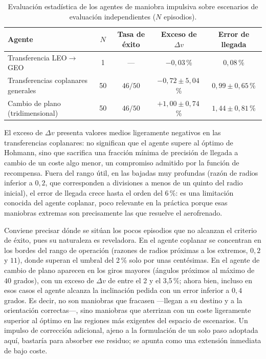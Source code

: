\begin{table}[htbp]
  \centering
  \caption{Evaluación estadística de los agentes de maniobra impulsiva sobre escenarios de evaluación independientes ($N$ episodios).}
  \label{tab:res-ia-estadistica}
  \begin{tabularx}{\textwidth}{X c c c c}
    \hline
    \textbf{Agente} & \textbf{$N$} & \textbf{Tasa de éxito} & \textbf{Exceso de $\Delta v$} & \textbf{Error de llegada} \\
    \hline
    Transferencia LEO$\rightarrow$GEO      & 1  & ---     & $-0{,}03$\,\%              & $0{,}08$\,\%              \\
    Transferencias coplanares generales    & 50 & $46/50$ & $-0{,}72 \pm 5{,}04$\,\%   & $0{,}99 \pm 0{,}65$\,\%   \\
    Cambio de plano (tridimensional)       & 50 & $46/50$ & $+1{,}00 \pm 0{,}74$\,\%   & $1{,}44 \pm 0{,}81$\,\%   \\
    \hline
  \end{tabularx}
\end{table}

El exceso de $\Delta v$ presenta valores medios ligeramente negativos en las transferencias coplanares: no significan que el agente supere al óptimo de Hohmann, sino que sacrifica una fracción mínima de precisión de llegada a cambio de un coste algo menor, un compromiso admitido por la función de recompensa. Fuera del rango útil, en las bajadas muy profundas (razón de radios inferior a $0{,}2$, que corresponden a divisiones a menos de un quinto del radio inicial), el error de llegada crece hasta el orden del 6\,\%: es una limitación conocida del agente coplanar, poco relevante en la práctica porque esas maniobras extremas son precisamente las que resuelve el aerofrenado.

Conviene precisar dónde se sitúan los pocos episodios que no alcanzan el criterio de éxito, pues su naturaleza es reveladora. En el agente coplanar se concentran en los bordes del rango de operación (razones de radios próximas a los extremos, $0{,}2$ y $11$), donde superan el umbral del 2\,\% solo por unas centésimas. En el agente de cambio de plano aparecen en los giros mayores (ángulos próximos al máximo de $40$ grados), con un exceso de $\Delta v$ de entre el 2 y el 3,5\,\%; ahora bien, incluso en esos casos el agente alcanza la inclinación pedida con un error inferior a $0{,}4$ grados. Es decir, no son maniobras que fracasen ---llegan a su destino y a la orientación correctas---, sino maniobras que aterrizan con un coste ligeramente superior al óptimo en las regiones más exigentes del espacio de escenarios. Un impulso de corrección adicional, ajeno a la formulación de un solo paso adoptada aquí, bastaría para absorber ese residuo; se apunta como una extensión inmediata de bajo coste.

